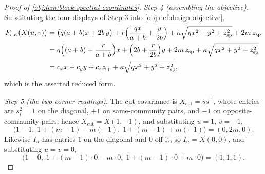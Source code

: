 \begin{proof}[Proof of \cref{obj:lem:block-spectral-coordinates}]
\emph{Step 4 (assembling the objective).}  Substituting the four displays of Step 3 into \cref{obj:def:design-objective},
\[
\begin{aligned}
F_{r,\kappa}\bigl(X(u,v)\bigr)
&=\bigl(q(a+b)x+2b\,y\bigr)
+r\Bigl(\frac{qx}{a+b}+\frac{y}{2b}\Bigr)
+\kappa\sqrt{qx^2+y^2+z_{\mathrm{sp}}^2}
+2m\,z_{\mathrm{sp}}\\
&=q\Bigl((a+b)+\frac{r}{a+b}\Bigr)x
+\Bigl(2b+\frac{r}{2b}\Bigr)y
+2m\,z_{\mathrm{sp}}
+\kappa\sqrt{qx^2+y^2+z_{\mathrm{sp}}^2}\\
&=c_xx+c_yy+c_zz_{\mathrm{sp}}
+\kappa\sqrt{qx^2+y^2+z_{\mathrm{sp}}^2},
\end{aligned}
\]
which is the asserted reduced form. %

\emph{Step 5 (the two corner readings).}  The cut covariance is \(X_{\mathrm{cut}}=ss^\top\), whose entries are \(s_i^2=1\) on the diagonal, \(+1\) on same-community pairs, and \(-1\) on opposite-community pairs; hence \(X_{\mathrm{cut}}=X(1,-1)\), and substituting \(u=1\), \(v=-1\),
\[
\bigl(1-1,\;1+(m-1)-m(-1),\;1+(m-1)+m(-1)\bigr)=(0,2m,0).
\]
Likewise \(I_n\) has entries \(1\) on the diagonal and \(0\) off it, so \(I_n=X(0,0)\), and substituting \(u=v=0\),
\[
\bigl(1-0,\;1+(m-1)\cdot0-m\cdot0,\;1+(m-1)\cdot0+m\cdot0\bigr)=(1,1,1).
\]
\end{proof}
